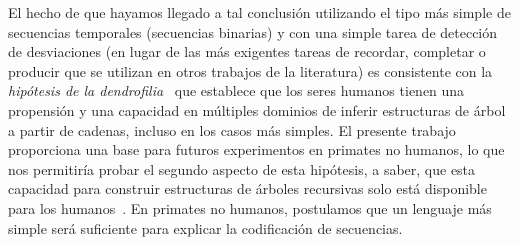 El hecho de que hayamos llegado a tal conclusión utilizando el tipo más simple de secuencias temporales (secuencias binarias) y con una simple tarea de detección de desviaciones (en lugar de las más exigentes tareas de recordar, completar o producir que se utilizan en otros trabajos de la literatura) es consistente con la \textit{hipótesis de la dendrofilia}~\cite{f8} que establece que los seres humanos tienen una propensión y una capacidad en múltiples dominios de inferir estructuras de árbol a partir de cadenas, incluso en los casos más simples. El presente trabajo proporciona una base para futuros experimentos en primates no humanos, lo que nos permitiría probar el segundo aspecto de esta hipótesis, a saber, que esta capacidad para construir estructuras de árboles recursivas solo está disponible para los humanos~\cite{f4,f6,f8}. En primates no humanos, postulamos que un lenguaje más simple será suficiente para explicar la codificación de secuencias.


